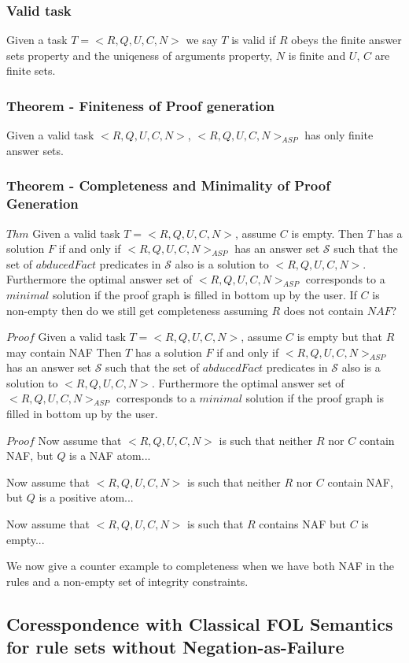 \documentclass[sigconf]{acmart}
\begin{document}
\subsubsection{Valid task}
Given a task $T = <R,Q,U,C,N>$ we say $T$ is valid if $R$ obeys the finite answer sets property and the uniqeness of arguments property, $N$ is finite and $U$, $C$ are finite sets. 
\subsubsection{Theorem - Finiteness of Proof generation}
Given a valid task $<R,Q,U,C,N>$, $<R,Q,U,C,N>_{ASP}$ has only finite answer sets. 
\subsubsection{Theorem - Completeness and Minimality of Proof Generation}
$Thm$ Given a valid task $T= <R,Q,U,C,N>$, assume $C$ is empty. Then $T$ has a solution $F$ if and only if $<R,Q,U,C,N>_{ASP}$ has an answer set $\mathcal{S}$ such that the set of $abducedFact$ predicates in $\mathcal{S}$ also is a solution to $<R,Q,U,C,N>$. Furthermore the optimal answer set of $<R,Q,U,C,N>_{ASP}$ corresponds to a $minimal$ solution if the proof graph is filled in bottom up by the user. If $C$ is non-empty then do we still get completeness assuming $R$ does not contain $NAF$?

$Proof$
Given a valid task $T= <R,Q,U,C,N>$, assume $C$ is empty but that $R$ may contain NAF Then $T$ has a solution $F$ if and only if $<R,Q,U,C,N>_{ASP}$ has an answer set $\mathcal{S}$ such that the set of $abducedFact$ predicates in $\mathcal{S}$ also is a solution to $<R,Q,U,C,N>$. Furthermore the optimal answer set of $<R,Q,U,C,N>_{ASP}$ corresponds to a $minimal$ solution if the proof graph is filled in bottom up by the user.

$Proof$ Now assume that $<R,Q,U,C,N>$ is such that neither $R$ nor $C$ contain NAF, but $Q$ is a NAF atom...

Now assume that $<R,Q,U,C,N>$ is such that neither $R$ nor $C$ contain NAF, but $Q$ is a positive atom...

Now assume that $<R,Q,U,C,N>$ is such that $R$ contains NAF but $C$ is empty...

We now give a counter example to completeness when we have both NAF in the rules and a non-empty set of integrity constraints.\\

\subsection{Coresspondence with Classical FOL Semantics for rule sets without Negation-as-Failure}
\end{document}
